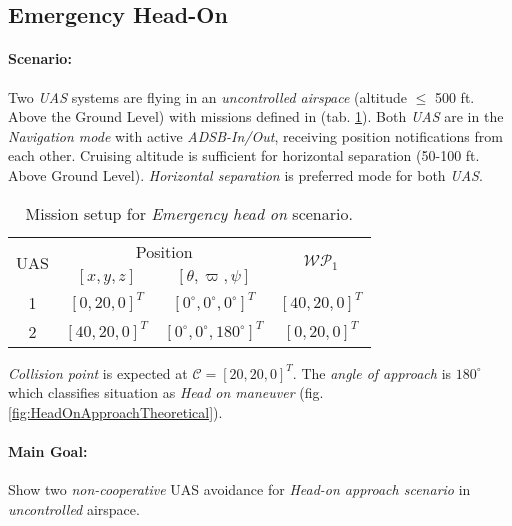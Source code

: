 \subsection{Emergency Head-On}\label{s:testEmergencyHeadOn}

\paragraph{Scenario:} Two  \emph{UAS} systems are flying in an \emph{uncontrolled airspace} (altitude $\le$ 500 ft. Above the Ground Level) with missions defined in (tab. \ref{tab:missionSetupEmergencyHeadOnScenario}). Both \emph{UAS} are in the  \emph{Navigation mode} with active \emph{ADSB-In/Out}, receiving position notifications from each other. Cruising altitude is sufficient for horizontal separation (50-100 ft. Above Ground Level). \emph{Horizontal separation} is preferred mode for both \emph{UAS}.


\begin{table}[H]
    \centering
    \begin{tabular}{c||c|c||c}
        \multirow{2}{*}{UAS} &\multicolumn{2}{c||}{Position} & \multirow{2}{*}{$\mathscr{WP}_1$} \\\cline{2-3}
          & $[x,y,z]$           & $[\theta,\varpi,\psi]$           & \\\hline\hline
        1 & $[0,20,0]^T $       & $[0^\circ,0^\circ,0^\circ]^T$    & $[40,20,0]^T$\\\hline 
        2 & $[40,20,0]^T $       & $[0^\circ,0^\circ,180^\circ]^T$  & $[0,20,0]^T$\\ 
    \end{tabular}
    \caption{Mission setup for \emph{Emergency head on} scenario.}
    \label{tab:missionSetupEmergencyHeadOnScenario}
\end{table}


\begin{note}
\emph{Collision point} is expected at $\mathscr{C}=[20,20,0]^T$. The \emph{angle of approach} is $180^{\circ}$  which classifies situation as \emph{Head on maneuver} (fig. \ref{fig:HeadOnApproachTheoretical}).
\end{note}


\paragraph{Main Goal:} Show two \emph{non-cooperative } UAS avoidance for \emph{Head-on approach scenario} in \emph{uncontrolled} airspace.


